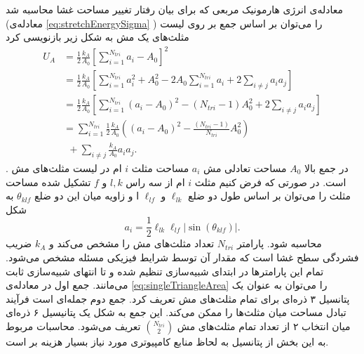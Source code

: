 معادله‌ی انرژی هارمونیک مربعی که برای بیان رفتار تغییر مساحت غشا محاسبه شد (معادله‌ی
\ref{eq:stretchEnergySigma}
) را می‌توان بر اساس جمع بر روی لیست مثلث‌های یک مش به شکل زیر بازنویسی کرد
\begin{equation}
\begin{aligned}
U_{A}&=\frac{1}{2}\frac{k_A}{A_0}\left[\sum_{i=1}^{N_{tri}}a_i-A_0\right]^2\\
&=\frac{1}{2}\frac{k_A}{A_0}\left[\sum_{i=1}^{N_{tri}}a_i^2+A_0^2-2A_0\sum_{i=1}^{N_{tri}}a_i+2\sum_{i\neq j}a_ia_j\right]\\
&=\frac{1}{2}\frac{k_A}{A_0}\left[\sum_{i=1}^{N_{tri}}(a_i-A_0)^2-(N_{tri}-1)A_0^2+2\sum_{i\neq j}a_ia_j\right]\\
&=\sum_{i=1}^{N_{tri}}\frac{1}{2}\frac{k_A}{A_0}\left((a_i-A_0)^2-\frac{(N_{tri}-1)}{N_{tri}}A_0^2\right)\\
&~~+\sum_{i\neq j}\frac{k_A}{A_0}a_ia_j.
\label{eq:GlobalAreaPotentialExpansion}
\end{aligned}
\end{equation}
. در جمع بالا 
$A_0$
مساحت تعادلی مش
$a_i$
مساحت مثلث
$i$
ام در لیست مثلث‌های مش است. در صورتی که فرض کنیم مثلث
$i$
ام از سه راس 
$l,k$
و
$f$
تشکیل شده مساحت مثلث را می‌توان بر اساس طول دو ضلع
$\ell_{lk}$
و
$\ell_{lf}$
 ا و زاویه‌ میان این دو ضلع
 $\theta_{klf}$
  به شکل 
 \begin{equation}
a_i=\frac{1}{2}\ell_{lk}\ell_{lf}|\sin(\theta_{klf})|.
\label{eq:singleTriangleArea}
\end{equation}
 محاسبه شود. پارامتر 
 $N_{tri}$
تعداد مثلث‌های مش را مشخص می‌کند و 
$k_A$
ضریب فشردگی سطح غشا است که مقدار آن توسط شرایط فیزیکی مسئله مشخص می‌شود. تمام این پارامتر‌ها در ابتدای شبیه‌سازی تنظیم شده و تا انتهای شبیه‌سازی ثابت می‌مانند. جمع اول در معادله‌ی 
 \ref{eq:singleTriangleArea}
 را می‌توان به عنوان یک پتانسیل ۳ ذره‌ای برای تمام مثلث‌های مش تعریف کرد. جمع دوم جمله‌ای است فرآیند تبادل مساحت میان مثلث‌ها را ممکن می‌کند. این جمع به شکل یک پتانیسیل ۶ ذره‌ای میان انتخاب ۲ از تعداد تمام مثلث‌های مش
 ${N_{tri} \choose 2}$
 تعریف می‌شود. محاسبات مربوط به این بخش از پتانسیل به لحاظ منابع کامپیوتری مورد نیاز بسیار هزینه بر است.


